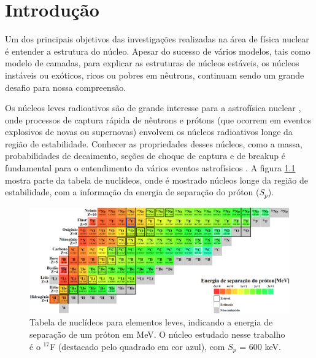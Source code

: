 \documentclass[a4paper,12pt,oneside]{book}
\begin{document}


\chapter{Introdução}

\par Um dos principais objetivos das investigações realizadas na área de física nuclear é entender a estrutura do núcleo. Apesar do sucesso de vários modelos, tais como modelo de camadas, para explicar as estruturas de núcleos estáveis, os núcleos instáveis ou exóticos, ricos ou pobres em nêutrons, continuam sendo um grande desafio para nossa compreensão.

\par Os núcleos leves radioativos são de grande interesse para a astrofísica nuclear \cite{BARDAYAN2017415}, onde processos de captura rápida de nêutrons e prótons (que ocorrem em eventos explosivos de novas ou supernovas) envolvem os núcleos radioativos longe da região de estabilidade. Conhecer as propriedades desses núcleos, como a massa, probabilidades de decaimento, seções de choque de captura e de breakup é fundamental para o entendimento da vários eventos astrofísicos \cite{BARDAYAN2017415, 10.3389/fphy.2020.602920}. A figura \ref{fig:chart_nuclides} mostra parte da tabela de nuclídeos, onde é mostrado núcleos longe da região de estabilidade, com a informação da energia de separação do próton ($S_p$).

\begin{figure}[H]
    \centering
    \includegraphics[scale = 0.25]{figs/chart_nuclides_2.png}
    \caption{Tabela de nuclídeos para elementos leves, indicando a energia de separação de um próton em MeV. O núcleo estudado nesse trabalho é o $^{17}$F (destacado pelo quadrado em cor azul), com $S_p$ = 600 keV. \cite{colourful_nuclide_chat}}
    \label{fig:chart_nuclides}
\end{figure}
\end{document}
